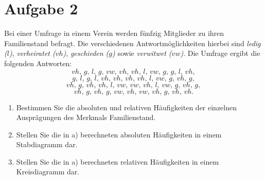 \documentclass{exercise}
\begin{document}
    \section*{Aufgabe 2}

    \begin{problem}
        Bei einer Umfrage in einem Verein werden fünfzig Mitglieder zu ihren Familienstand befragt.
        Die verschiedenen Antwortmöglichkeiten hierbei sind \emph{ledig (\(l\))}, \emph{verheiratet (\(vh\))}, \emph{geschieden (\(g\))} sowie \emph{verwitwet (\(vw\))}.
        Die Umfrage ergibt die folgenden Antworten:
        \[
            vh,\,g,\,l,\,g,\,vw,\,vh,\,vh,\,l,\,vw,\,g,\,g,\,l,\,vh,
        \]
        \[
            g,\,l,\,g,\,l,\,vh,\,vh,\,vh,\,vh,\,l,\,vw,\,g,\,vh,\,g,
        \]
        \[
            vh,\,g,\,vh,\,vh,\,l,\,vw,\,vw,\,vh,\,l,\,vw,\,g,\,vh,\,g,
        \]
        \[
            vh,\,g,\,vh,\,g,\,vw,\,vh,\,vw,\,vh,\,g,\,vh,\,vh.
        \]
        \begin{enumerate}
            \item Bestimmen Sie die absoluten und relativen Häufigkeiten der einzelnen Ausprägungen des Merkmals Familienstand.
            \item Stellen Sie die in a) berechneten absoluten Häufigkeiten in einem Stabdiagramm dar.
            \item Stellen Sie die in a) berechneten relativen Häufigkeiten in einem Kreisdiagramm dar.
        \end{enumerate}
    \end{problem}
    
\end{document}
